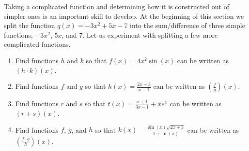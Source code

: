 \documentclass{ximera}
\begin{document}
	
	Taking a complicated function and determining how it is constructed out of simpler ones is an important skill to develop. At the beginning of this section 
	we split the function $q(x) =  -3x^2 + 5x - 7$ into the sum/difference of three simple functions, $-3x^2$, $5x$, and $7$. Let us experiment with 
	splitting a few more complicated functions.
	\begin{example}
		\begin{enumerate}	
			\item Find functions $h$ and $k$ so that $f(x) = 4x^2 \sin(x)$ can be written as $(h\cdot k)(x)$.\\
			\item Find functions $f$ and $g$ so that $h(x) = \frac{2x+3}{x-1}$ can be written as $\left(\frac{f}{g}\right)(x)$.\\
			\item Find functions $r$ and $s$ so that $t(x) = \frac{x+1}{3x-1}+ x e^x$ can be written as $\left(r + s \right)(x)$.\\
			\item Find functions $f$, $g$, and $h$ so that $k(x) = \frac{\sin(x) \sqrt{2x+3}}{1+\ln(x)}$ can be written as 
				$\left( \frac{f\cdot g}{h}\right)(x)$.\\
		\end{enumerate}
		
		
		\begin{explanation}


\end{explanation}
\end{example}
\end{document}
